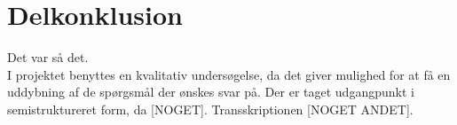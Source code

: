 \section{Delkonklusion}
Det var så det.\\
I projektet benyttes en kvalitativ undersøgelse, da det giver mulighed for at få en uddybning af de spørgsmål der ønskes svar på. Der er taget udgangpunkt i semistruktureret form, da [NOGET]. Transskriptionen [NOGET ANDET].